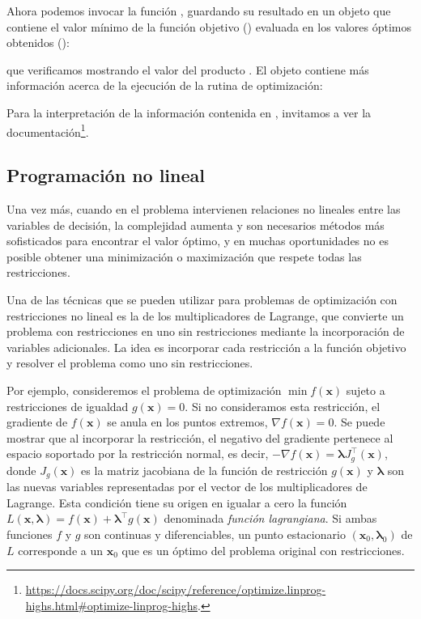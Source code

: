 
Ahora podemos invocar la función , guardando su resultado en un objeto  que contiene el valor mínimo de la función objetivo () evaluada en los valores óptimos obtenidos ():


\noindent que verificamos mostrando el valor del producto . El objeto  contiene más información acerca de la ejecución de la rutina de optimización:


Para la interpretación de la información contenida en , invitamos a ver la documentación\footnote{\url{https://docs.scipy.org/doc/scipy/reference/optimize.linprog-highs.html\#optimize-linprog-highs}.}.

\subsection{Programación no lineal}
Una vez más, cuando en el problema intervienen relaciones no lineales entre las variables de decisión, la complejidad aumenta y son necesarios métodos más sofisticados para encontrar el valor óptimo, y en muchas oportunidades no es posible obtener una minimización o maximización que respete todas las restricciones. 

Una de las técnicas que se pueden utilizar para problemas de optimización con restricciones no lineal es la de los multiplicadores de Lagrange, que convierte un problema con restricciones en uno sin restricciones mediante la incorporación de variables adicionales. La idea es incorporar cada restricción a la función objetivo y resolver el problema como uno sin restricciones.

Por ejemplo, consideremos el problema de optimización $\min f(\bm{x})$ sujeto a restricciones de igualdad $g(\bm{x}) = 0$. Si no consideramos esta restricción, el gradiente de $f(\bm{x})$ se anula en los puntos extremos, $\nabla f(\bm{x}) = 0$. Se puede mostrar que al incorporar la restricción, el negativo del gradiente pertenece al espacio soportado por la restricción normal, es decir, $-\nabla f(\bm{x}) = \bm{\lambda } J_g^{\intercal}(\bm{x})$, donde $J_g(\bm{x})$ es la matriz jacobiana de la función de restricción $g(\bm{x})$ y $\bm{\lambda}$ son las nuevas variables representadas por el vector de los multiplicadores de Lagrange. Esta condición tiene su origen en igualar a cero la función $L(\bm{x}, \bm{\lambda}) = f(\bm{x}) + \bm{\lambda}^{\intercal} g(\bm{x})$ denominada \textit{función lagrangiana}. Si ambas funciones $f$ y $g$ son continuas y diferenciables, un punto estacionario $(\bm{x}_0, \bm{\lambda}_0)$ de $L$ corresponde a un $\bm{x}_0$ que es un óptimo del problema original con restricciones.

